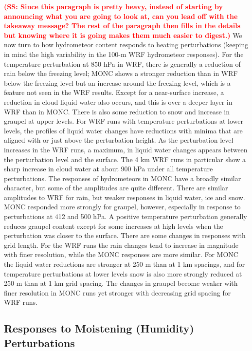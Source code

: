 \documentclass[draft]{agujournal2019}
\newcommand{\todo}[1]{\textcolor{red}{\textbf{(#1)}}}
\begin{document}
\todo{SS: Since this paragraph is pretty heavy, instead of starting by
announcing what you are going to look at, can you lead off with the takeaway
message?  The rest of the paragraph then fills in the details but knowing where
it is going makes them much easier to digest.} We now turn to how hydrometeor
content responds to heating perturbations (keeping in mind the high variability
in the 100-m WRF hydrometeor responses). For the temperature perturbation at 850
hPa in WRF, there is generally a reduction of rain below the freezing level;
MONC shows a stronger reduction than in WRF below the freezing level but an
increase around the freezing level, which is a feature not seen in the WRF
results. Except for a near-surface increase, a reduction in cloud liquid water
also occurs, and this is over a deeper layer in WRF than in MONC. There is also
some reduction to snow and increase in graupel at upper levels. For WRF runs
with temperature perturbations at lower levels, the profiles of liquid water
changes have reductions with minima that are aligned with or just above the
perturbation height. As the perturbation level increases in the WRF runs, a
maximum, in liquid water changes appears between the perturbation level and the
surface. The 4 km WRF runs in particular show a sharp increase in cloud water at
about 900 hPa under all temperature perturbations. The responses of hydrometeors
in MONC have a broadly similar character, but some of the amplitudes are quite
different. There are similar amplitudes to WRF for rain, but weaker responses in
liquid water, ice and snow. MONC responded more strongly for graupel, however,
especially in response to perturbations at 412 and 500 hPa. A positive
temperature perturbation generally reduces graupel content except for some
increases at high levels when the perturbation was closer to the surface. There
are some changes in responses with grid length. For the WRF runs the rain
changes tend to increase in magnitude with finer resolution, while the MONC
responses are more similar. For MONC the liquid water reductions are stronger at
250 m than at 1 km spacings, and for temperature perturbations at lower levels
snow is also more strongly reduced at 250 m than at 1 km grid spacing. The
changes in graupel become weaker with finer resolution in MONC runs yet stronger
with decreasing grid spacing for WRF runs. 

\subsection{Responses to Moistening (Humidity) Perturbations}
\end{document}
